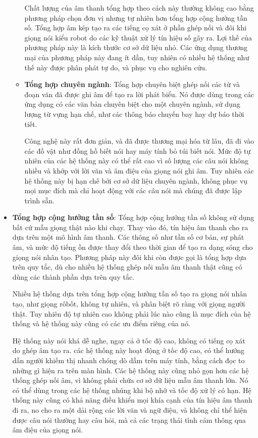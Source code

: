 \begin{itemize}
\begin{itemize}
Chất lượng của âm thanh tổng hợp theo cách này thường không cao bằng phương pháp chọn đơn vị nhưng tự nhiên hơn tổng hợp cộng hưởng tần số. Tổng hợp âm kép tạo ra các tiếng cọ xát ở phần ghép nối và đôi khi giọng nói kiểu robot do các kỹ thuật xử lý tín hiệu số gây ra. Lợi thế của phương pháp này là kích thước cơ sở dữ liệu nhỏ. Các ứng dụng thương mại của phương pháp này đang ít dần, tuy nhiên có nhiều hệ thống như thế này được phân phát tự do, và phục vụ cho nghiên cứu.

\item \textbf{Tổng hợp chuyên ngành}: Tổng hợp chuyên biệt ghép nối các từ và đoạn văn đã được ghi âm để tạo ra lời phát biểu. Nó được dùng trong các ứng dụng có các văn bản chuyên biệt cho một chuyên ngành, sử dụng lượng từ vựng hạn chế, như các thông báo chuyến bay hay dự báo thời tiết.

Công nghệ này rất đơn giản, và đã được thương mại hóa từ lâu, đã đi vào các đồ vật như đồng hồ biết nói hay máy tính bỏ túi biết nói. Mức độ tự nhiên của các hệ thống này có thể rất cao vì số lượng các câu nói không nhiều và khớp với lời văn và âm điệu của giọng nói ghi âm. Tuy nhiên các hệ thống này bị hạn chế bởi cơ sở dữ liệu chuyên ngành, không phục vụ mọi mục đích mà chỉ hoạt động với các câu nói mà chúng đã được lập trình sẵn.
\end{itemize}

\item \textbf{Tổng hợp cộng hưởng tần số}: Tổng hợp cộng hưởng tần số không sử dụng bất cứ mẫu giọng thật nào khi chạy. Thay vào đó, tín hiệu âm thanh cho ra dựa trên một mô hình âm thanh. Các thông số như tần số cơ bản, sự phát âm, và mức độ tiếng ồn được thay đổi theo thời gian để tạo ra dạng sóng cho giọng nói nhân tạo. Phương pháp này đôi khi còn được gọi là tổng hợp dựa trên quy tắc, dù cho nhiều hệ thống ghép nối mẫu âm thanh thật cũng có dùng các thành phần dựa trên quy tắc.

Nhiều hệ thống dựa trên tổng hợp cộng hưởng tần số tạo ra giọng nói nhân tạo, như giọng rôbốt, không tự nhiên, và phân biệt rõ ràng với giọng người thật. Tuy nhiên độ tự nhiên cao không phải lúc nào cũng là mục đích của hệ thống và hệ thống này cũng có các ưu điểm riêng của nó.

Hệ thống này nói khá dễ nghe, ngay cả ở tốc độ cao, không có tiếng cọ xát do ghép âm tạo ra. các hệ thống này hoạt động ở tốc độ cao, có thể hướng dẫn người khiếm thị nhanh chóng dò dẫm trên máy tính, bằng cách đọc to những gì hiện ra trên màn hình. Các hệ thống này cũng nhỏ gọn hơn các hệ thống ghép nối âm, vì không phải chứa cơ sở dữ liệu mẫu âm thanh lớn. Nó có thể dùng trong các hệ thống nhúng khi bộ nhớ và tốc độ xử lý có hạn. Hệ thống này cũng có khả năng điều khiển mọi khía cạnh của tín hiệu âm thanh đi ra, no cho ra một dải rộng các lời văn và ngữ điệu, và không chỉ thể hiện được câu nói thường hay câu hỏi, mà cả các trạng thái tình cảm thông qua âm điệu của giọng nói.


\end{itemize}
